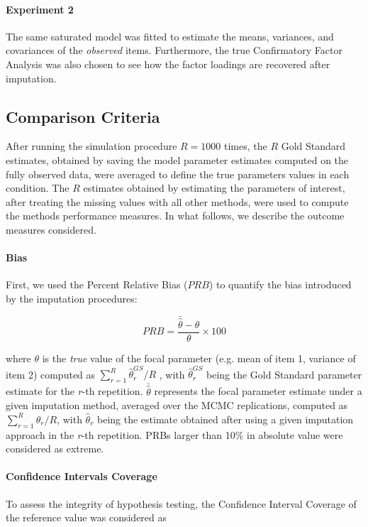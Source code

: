 	\paragraph{Experiment 2}
	The same saturated model was fitted to estimate the means, variances, and covariances of the 
	\emph{observed} items.
	Furthermore, the true Confirmatory Factor Analysis was also chosen to see how the factor loadings 
	are recovered after imputation.

\subsection{Comparison Criteria} \label{criteria}

	After running the simulation procedure $R=1000$ times, the $R$ Gold Standard estimates, obtained by saving the model 
	parameter estimates computed on the fully observed data, were averaged to define the true parameters values 
	in each condition.
	The $R$ estimates obtained by estimating the parameters of interest, after treating the missing values with all other 
	methods, were used to compute the methods performance measures.
	In what follows, we describe the outcome measures considered.

	\paragraph{Bias}

	First, we used the Percent Relative Bias ($PRB$) to quantify the bias introduced by 
	the imputation procedures:

	\begin{equation} \label{eqn:prb}
		PRB = \frac{\bar{\hat{\theta}} - \theta}{\theta} \times 100
	\end{equation}
	
	where $\theta$ is the \emph{true} value of the focal parameter (e.g. mean of item 1, variance of item 2)
	computed as 
	$\sum_{r=1}^{R} \hat{\theta}_{r}^{GS}/R$
	, with
	$\hat{\theta}_{r}^{GS}$ 
	being the Gold Standard parameter estimate for the \emph{r}-th repetition. 
	$\bar{\hat{\theta}}$ represents the focal parameter estimate under a given imputation method, averaged over 
	the MCMC replications, computed as
	$\sum_{r=1}^{R} \hat{\theta}_{r}/R$,
	with
	$\hat{\theta}_{r}$ being the estimate obtained after using a given imputation approach in the 
	\emph{r}-th repetition.
	PRBs larger than 10\% in absolute value were considered as extreme.

	\paragraph{Confidence Intervals Coverage}
	To assess the integrity of hypothesis testing, the Confidence Interval Coverage of the reference value
	was considered as


